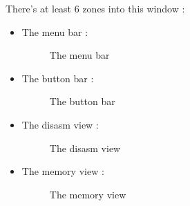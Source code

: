 \documentclass[10pt]{report}
\begin{document}
There's at least 6 zones into this window :\newline
\begin{itemize}
\item The menu bar :\newline
\begin{figure}[H]
\centering
{}
\caption{The menu bar}
\end{figure}
\item The button bar :\newline
\begin{figure}[H]
\centering
{}
\caption{The button bar}
\end{figure}
\item The disasm view :\newline
\begin{figure}[H]
\centering
{}
\caption{The disasm view}
\end{figure}
\item The memory view :\newline
\begin{figure}[H]
\centering
{}
\caption{The memory view}

\end{figure}
\end{itemize}
\end{document}
